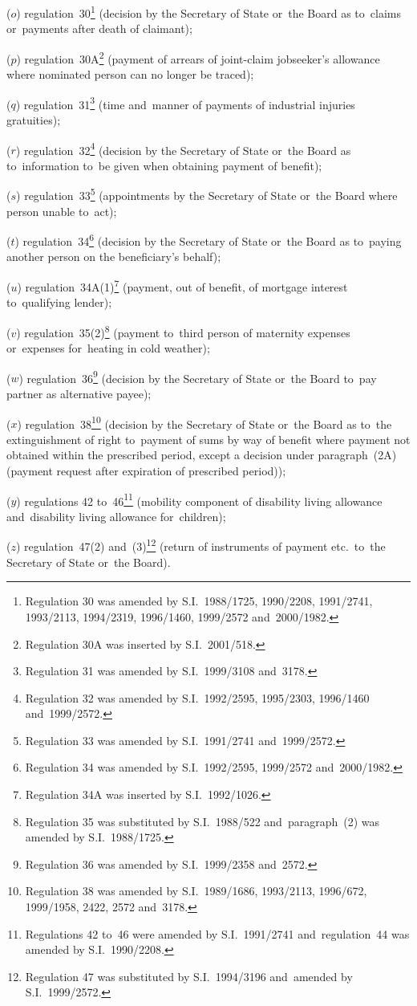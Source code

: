 \documentclass[12pt,a4paper]{article}
\begin{document}
\begin{enumerate}
($o$) regulation~30\footnote{Regulation 30 was amended by S.I.~1988/1725, 1990/\hspace{0pt}2208, 1991/2741, 1993/2113, 1994/2319, 1996/1460, 1999/2572 and~2000/1982.} (decision by the Secretary of State or~the Board as to~claims or~payments after death of claimant);

($p$) regulation~30A\footnote{Regulation 30A was inserted by S.I.~2001/518.} (payment of arrears of joint-claim jobseeker’s allowance where nominated person can no longer be traced);

($q$) regulation~31\footnote{Regulation 31 was amended by S.I.~1999/3108 and~3178.} (time and~manner of payments of industrial injuries gratuities);

($r$) regulation~32\footnote{Regulation 32 was amended by S.I.~1992/2595, 1995/2303, 1996/1460 and~1999/2572.} (decision by the Secretary of State or~the Board as to~information to~be given when obtaining payment of benefit);

\pagebreak[3]

($s$) regulation~33\footnote{Regulation 33 was amended by S.I.~1991/2741 and~1999/2572.} (appointments by the Secretary of State or~the Board where person unable to~act);

($t$) regulation~34\footnote{Regulation 34 was amended by S.I.~1992/2595, 1999/2572 and~2000/1982.} (decision by the Secretary of State or~the Board as to~paying another person on the beneficiary’s behalf);

($u$) regulation~34A(1)\footnote{Regulation 34A was inserted by S.I.~1992/1026.} (payment, out of benefit, of mortgage interest to~qualifying lender);

($v$) regulation~35(2)\footnote{Regulation 35 was substituted by S.I.~1988/522 and~paragraph~(2) was amended by S.I.~1988/1725.} (payment to~third person of maternity expenses or~expenses for~heating in cold weather);

($w$) regulation~36\footnote{Regulation 36 was amended by S.I.~1999/2358 and~2572.} (decision by the Secretary of State or~the Board to~pay partner as alternative payee);

($x$) regulation~38\footnote{Regulation 38 was amended by S.I.~1989/1686, 1993/2113, 1996/672, 1999/1958, 2422, 2572 and~3178.} (decision by the Secretary of State or~the Board as to~the extinguishment of right to~payment of sums by way of benefit where payment not obtained within the prescribed period, except a decision under paragraph~(2A) (payment request after expiration of prescribed period));

($y$) regulations 42 to~46\footnote{Regulations 42 to~46 were amended by S.I.~1991/2741 and~regulation~44 was amended by S.I.~1990/2208.} (mobility component of disability living allowance and~disability living allowance for~children);

($z$) regulation~47(2) and~(3)\footnote{Regulation 47 was substituted by S.I.~1994/3196 and~amended by S.I.~1999/2572.} (return of instruments of payment etc.\ to~the Secretary of State or~the Board).
\end{enumerate}
\end{document}

